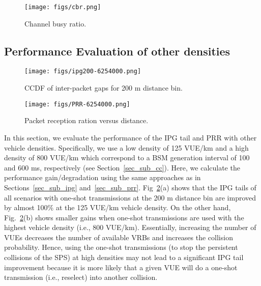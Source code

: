 \documentclass[conference]{IEEEtran}
\begin{document}
\begin{figure}
  \begin{center}
  \texttt{[image: figs/cbr.png]}
  \caption{Channel busy ratio.}\label{fig_cbr}
  \vspace{-.25in}
  \end{center}
\end{figure}

\subsection{Performance Evaluation of other densities}\label{sec_sub_otherd}
\begin{figure}
  \begin{center}
  \texttt{[image: figs/ipg200-6254000.png]}
  \caption{CCDF of inter-packet gaps for 200 m distance bin.}\label{fig_ipg6254000}
  \vspace{-.25in}
  \end{center}
\end{figure}

\begin{figure}
  \begin{center}
  \texttt{[image: figs/PRR-6254000.png]}
  \caption{Packet reception ration versus distance.}\label{fig_prr625400}
  \vspace{-.25in}
  \end{center}
\end{figure}

In this section, we evaluate the performance of the IPG tail and PRR with other vehicle densities. Specifically, we use a low density of 125 VUE/km and a high density of 800 VUE/km which correspond to a BSM generation interval of 100 and 600 ms, respectively (see Section~\ref{sec_sub_cc}). Here, we calculate the performance gain/degradation using the same approaches as in Sections~\ref{sec_sub_ipg} and~\ref{sec_sub_prr}. Fig~\ref{fig_ipg6254000}(a) shows that the IPG tails of all scenarios with one-shot transmissions at the 200 m distance bin are improved by almost 100\% at the 125 VUE/km vehicle density. On the other hand, Fig.~\ref{fig_ipg6254000}(b) shows smaller gains when one-shot transmissions are used with the highest vehicle density (i.e., 800 VUE/km). Essentially, increasing the number of VUEs decreases the number of available VRBs and increases the collision probability. Hence, using the one-shot transmissions (to stop the persistent collisions of the SPS) at high densities may not lead to a significant IPG tail improvement because it is more likely that a given VUE will do a one-shot transmission (i.e., reselect) into another collision.
\end{document}
